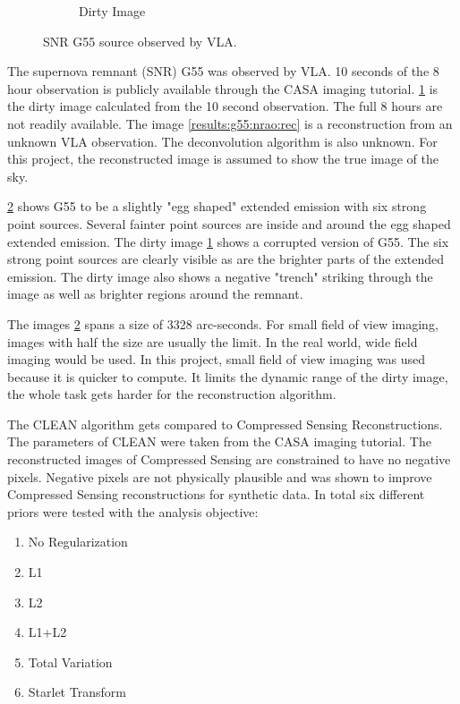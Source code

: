 \begin{figure}[h]
\begin{subfigure}[b]{0.45\linewidth}
		\caption{Dirty Image}
		\label{results:g55:nrao:dirty}
	\end{subfigure}
	\caption{SNR G55 source observed by VLA.}
	\label{results:g55:nrao}
\end{figure}

The supernova remnant (SNR) G55 was observed by VLA. 10 seconds of the 8 hour observation is publicly available through the CASA imaging tutorial\cite{casaImagingGuide}. \ref{results:g55:nrao:dirty} is the dirty image calculated from the 10 second observation. The full 8 hours are not readily available. The image \ref{results:g55:nrao:rec} is a reconstruction from an unknown VLA observation. The deconvolution algorithm is also unknown. For this project, the reconstructed image is assumed to show the true image of the sky.

\ref{results:g55:nrao} shows G55 to be a slightly "egg shaped" extended emission with six strong point sources. Several fainter point sources are inside and around the egg shaped extended emission. The dirty image \ref{results:g55:nrao:dirty} shows a corrupted version of G55. The six strong point sources are clearly visible as are the brighter parts of the extended emission. The dirty image also shows a negative "trench" striking through the image as well as brighter regions around the remnant. 

The images \ref{results:g55:nrao} spans a size of 3328 arc-seconds. For small field of view imaging, images with half the size are usually the limit. In the real world, wide field imaging would be used. In this project, small field of view imaging was used because it is quicker to compute. It limits the dynamic range of the dirty image, the whole task gets harder for the reconstruction algorithm.

The CLEAN algorithm gets compared to Compressed Sensing Reconstructions. The parameters of CLEAN were taken from the CASA imaging tutorial\cite{casaImagingGuide}. The reconstructed images of Compressed Sensing are constrained to have no negative pixels. Negative pixels are not physically plausible and was shown to improve Compressed Sensing reconstructions for synthetic data\cite{mcewen2011compressed}. In total six different priors were tested with the analysis objective:
\begin{enumerate}
	\item No Regularization
	\item L1
	\item L2
	\item L1+L2
	\item Total Variation
	\item Starlet Transform
\end{enumerate}

